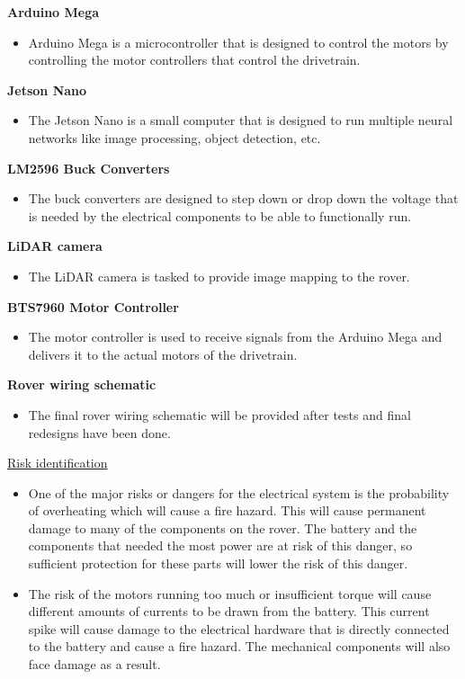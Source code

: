 \documentclass[a4paper, 10pt]{article}
\begin{document}
\textbf{Arduino Mega}

\begin{itemize}
\item
	Arduino Mega is a microcontroller that is designed to control the motors by controlling the motor controllers that control the drivetrain.
\end{itemize}

\textbf{Jetson Nano}

\begin{itemize}
\item
	The Jetson Nano is a small computer that is designed to run multiple neural networks like image processing, object detection, etc. 
\end{itemize}

\textbf{LM2596 Buck Converters}
\begin{itemize}
\item
	The buck converters are designed to step down or drop down the voltage that is needed by the electrical components to be able to functionally run.
\end{itemize}

\textbf{LiDAR camera}

\begin{itemize}
\item
	The LiDAR camera is tasked to provide image mapping to the rover.
\end{itemize}

\textbf{BTS7960 Motor Controller}

\begin{itemize}
\item
	The motor controller is used to receive signals from the Arduino Mega and delivers it to the actual motors of the drivetrain.
\end{itemize}

\textbf{Rover wiring schematic}

\begin{itemize}
\item
	The final rover wiring schematic will be provided after tests and final redesigns have been done. 
\end{itemize}

\underline{Risk identification}

\begin{itemize}
\item
	One of the major risks or dangers for the electrical system is the probability of overheating which will cause a fire hazard. This will cause permanent damage to many of the components on the rover. The battery and the components that needed the most power are at risk of this danger, so sufficient protection for these parts will lower the risk of this danger.

\item
	The risk of the motors running too much or insufficient torque will cause different amounts of currents to be drawn from the battery. This current spike will cause damage to the electrical hardware that is directly connected to the battery and cause a fire hazard. The mechanical components will also face damage as a result.
\end{itemize}
\end{document}
